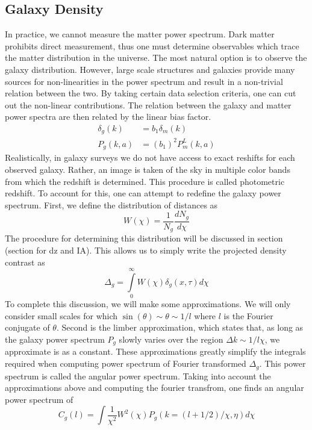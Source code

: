 \subsection{Galaxy Density}
In practice, we cannot measure the matter power spectrum. Dark matter prohibits direct measurement, thus one must determine observables which trace the matter distribution in the universe. The most natural option is to observe the galaxy distribution. However, large scale structures and galaxies provide many sources for non-linearities in the power spectrum and result in a non-trivial relation between the two. By taking certain data selection criteria, one can cut out the non-linear contributions. The relation between the galaxy and matter power spectra are then related by the linear bias factor.
\begin{equation}
	\begin{split}
		\delta_g(k) &= b_1 \delta_m(k) \\
		P_g(k,a) &= (b_1)^2P_m^L(k,a)
	\end{split}
\end{equation}
Realistically, in galaxy surveys we do not have access to exact reshifts for each observed galaxy. Rather, an image is taken of the sky in multiple color bands from which the redshift is determined. This procedure is called photometric redshift. To account for this, one can attempt to redefine the galaxy power spectrum. First, we define the distribution of distances as
\begin{equation}
	W(\chi) = \frac{1}{N_g}\frac{dN_g}{d\chi}
\end{equation}
The procedure for determining this distribution will be discussed in section (section for dz and IA). This allows us to simply write the projected density contrast as
\begin{equation}
	\Delta_g = \int\limits_0^\infty W(\chi)\delta_g(x,\tau)d\chi
\end{equation}
To complete this discussion, we will make some approximations. We will only consider small scales for which $\sin(\theta)\sim \theta \sim 1/l$ where $l$ is the Fourier conjugate of $\theta$. Second is the limber approximation, which states that, as long as the galaxy power spectrum $P_g$ slowly varies over the region $\Delta k \sim 1/l\chi$, we approximate is as a constant. These approximations greatly simplify the integrals required when computing power spectrum of Fourier transformed $\Delta_g$. This power spectrum is called the angular power spectrum. Taking into account the approximations above and computing the fourier transfrom, one finds an angular power spectrum of
\begin{equation}
 	C_g(l) =\int \frac{1}{\chi^2}W^2(\chi)P_g(k=(l+1/2)/\chi,\eta) d\chi
\end{equation} 
